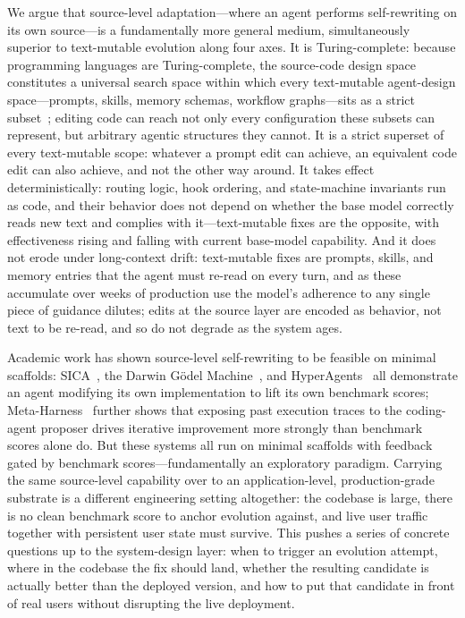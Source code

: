 We argue that source-level adaptation---where an agent performs self-rewriting on its own source---is a fundamentally more general medium, simultaneously superior to text-mutable evolution along four axes. It is Turing-complete: because programming languages are Turing-complete, the source-code design space constitutes a universal search space within which every text-mutable agent-design space---prompts, skills, memory schemas, workflow graphs---sits as a strict subset~\citep{hu2025automated}; editing code can reach not only every configuration these subsets can represent, but arbitrary agentic structures they cannot. It is a strict superset of every text-mutable scope: whatever a prompt edit can achieve, an equivalent code edit can also achieve, and not the other way around. It takes effect deterministically: routing logic, hook ordering, and state-machine invariants run as code, and their behavior does not depend on whether the base model correctly reads new text and complies with it---text-mutable fixes are the opposite, with effectiveness rising and falling with current base-model capability. And it does not erode under long-context drift: text-mutable fixes are prompts, skills, and memory entries that the agent must re-read on every turn, and as these accumulate over weeks of production use the model's adherence to any single piece of guidance dilutes; edits at the source layer are encoded as behavior, not text to be re-read, and so do not degrade as the system ages.

Academic work has shown source-level self-rewriting to be feasible on minimal scaffolds: SICA~\citep{robeyns2025self}, the Darwin G\"{o}del Machine~\citep{zhang2025darwin}, and HyperAgents~\citep{zhang2026hyperagents} all demonstrate an agent modifying its own implementation to lift its own benchmark scores; Meta-Harness~\citep{lee2026meta} further shows that exposing past execution traces to the coding-agent proposer drives iterative improvement more strongly than benchmark scores alone do. But these systems all run on minimal scaffolds with feedback gated by benchmark scores---fundamentally an exploratory paradigm. Carrying the same source-level capability over to an application-level, production-grade substrate is a different engineering setting altogether: the codebase is large, there is no clean benchmark score to anchor evolution against, and live user traffic together with persistent user state must survive. This pushes a series of concrete questions up to the system-design layer: when to trigger an evolution attempt, where in the codebase the fix should land, whether the resulting candidate is actually better than the deployed version, and how to put that candidate in front of real users without disrupting the live deployment.

